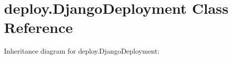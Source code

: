 \hypertarget{classdeploy_1_1DjangoDeployment}{}\section{deploy.\+Django\+Deployment Class Reference}
\label{classdeploy_1_1DjangoDeployment}


Inheritance diagram for deploy.\+Django\+Deployment\+:
